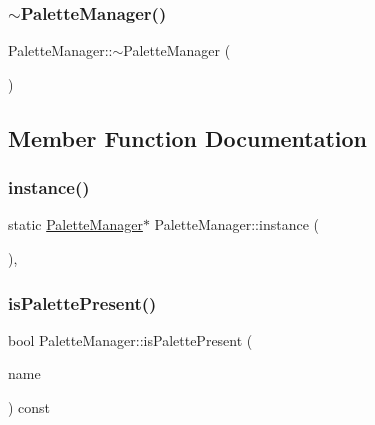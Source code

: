 \mbox{\label{class_palette_manager_a90acc7c21ba8ef53b2315d52610dda45}} 
\subsubsection{\texorpdfstring{$\sim$PaletteManager()}{~PaletteManager()}}
{\footnotesize\ttfamily Palette\+Manager\+::$\sim$\+Palette\+Manager (\begin{DoxyParamCaption}{ }\end{DoxyParamCaption})}



\subsection{Member Function Documentation}
\mbox{\label{class_palette_manager_a56bdac299828aabbc7528f6844bb413b}} 
\subsubsection{\texorpdfstring{instance()}{instance()}}
{\footnotesize\ttfamily static \mbox{\hyperlink{class_palette_manager}{Palette\+Manager}}$\ast$ Palette\+Manager\+::instance (\begin{DoxyParamCaption}{ }\end{DoxyParamCaption})\hspace{0.3cm}{\ttfamily [inline]}, {\ttfamily [static]}}

\mbox{\label{class_palette_manager_ac16ee980a0b6ef56829a8b66a4211a83}} 
\subsubsection{\texorpdfstring{isPalettePresent()}{isPalettePresent()}}
{\footnotesize\ttfamily bool Palette\+Manager\+::is\+Palette\+Present (\begin{DoxyParamCaption}\item[{const Q\+String \&}]{name }\end{DoxyParamCaption}) const}

